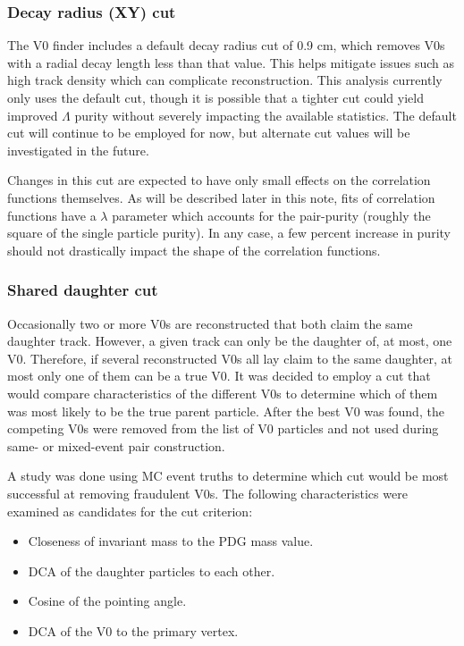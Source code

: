 \subsubsection{Decay radius (XY) cut}
The V0 finder includes a default decay radius cut of 0.9 cm, which removes V0s with a radial decay length less than that value.  
This helps mitigate issues such as high track density which can complicate reconstruction.  
This analysis currently only uses the default cut, though it is possible that a tighter cut could yield improved $\Lambda$ purity without severely impacting the available statistics.  
The default cut will continue to be employed for now, but alternate cut values will be investigated in the future.  

Changes in this cut are expected to have only small effects on the correlation functions themselves.  
As will be described later in this note, fits of correlation functions have a $\lambda$ parameter which accounts for the pair-purity (roughly the square of the single particle purity).  
In any case, a few percent increase in purity should not drastically impact the shape of the correlation functions.


\subsubsection{Shared daughter cut}

Occasionally two or more V0s are reconstructed that both claim the same daughter track.  
However, a given track can only be the daughter of, at most, one V0.  
Therefore, if several reconstructed V0s all lay claim to the same daughter, at most only one of them can be a true V0.  
It was decided to employ a cut that would compare characteristics of the different V0s to determine which of them was most likely to be the true parent particle.  
After the best V0 was found, the competing V0s were removed from the list of V0 particles and not used during same- or mixed-event pair construction.

A study was done using MC event truths to determine which cut would be most successful at removing fraudulent V0s.  
The following characteristics were examined as candidates for the cut criterion:

\begin{itemize}
\item Closeness of invariant mass to the PDG mass value.
\item DCA of the daughter particles to each other.
\item Cosine of the pointing angle.
\item DCA of the V0 to the primary vertex.
\end{itemize}

